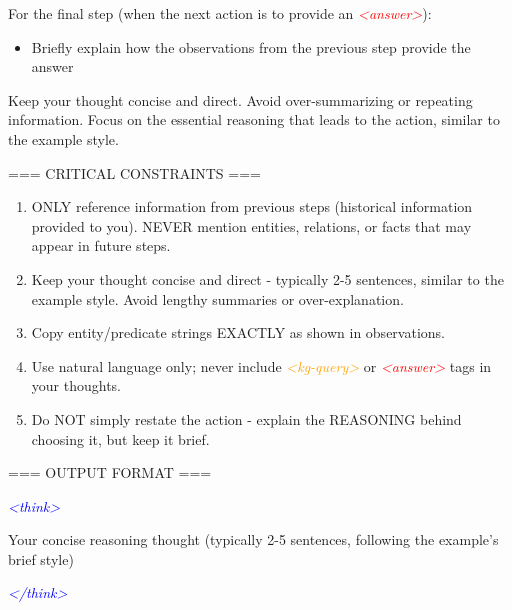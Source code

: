 \begin{tcolorbox}
For the final step (when the next action is to provide an \textcolor{red}{\textit{<answer>}}):
\begin{itemize}
  \item Briefly explain how the observations from the previous step provide the answer
\end{itemize}

Keep your thought concise and direct. Avoid over-summarizing or repeating information. Focus on the essential reasoning that leads to the action, similar to the example style.

=== CRITICAL CONSTRAINTS ===
\begin{enumerate}
  \item ONLY reference information from previous steps (historical information provided to you). NEVER mention entities, relations, or facts that may appear in future steps.
  \item Keep your thought concise and direct - typically 2-5 sentences, similar to the example style. Avoid lengthy summaries or over-explanation.
  \item Copy entity/predicate strings EXACTLY as shown in observations.
  \item Use natural language only; never include \textcolor{orange}{\textit{<kg-query>}} or \textcolor{red}{\textit{<answer>}} tags in your thoughts.
  \item Do NOT simply restate the action - explain the REASONING behind choosing it, but keep it brief.
\end{enumerate}

=== OUTPUT FORMAT ===

\textcolor{blue}{\textit{<think>}}

Your concise reasoning thought (typically 2-5 sentences, following the example's brief style)

\textcolor{blue}{\textit{</think>}}
\end{tcolorbox}

